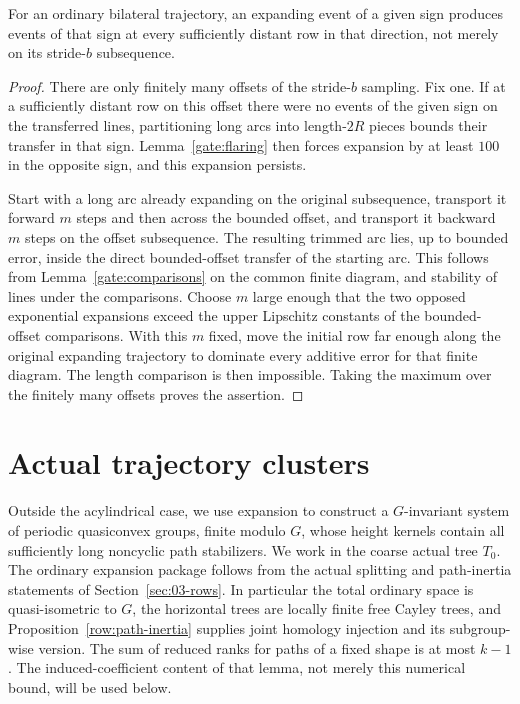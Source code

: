 \begin{lemma}\label{gate:offset}
For an ordinary bilateral trajectory, an expanding event of a given sign
produces events of that sign at every sufficiently distant row in that
direction, not merely on its stride-$b$ subsequence.
\end{lemma}
\begin{proof}
There are only finitely many offsets of the stride-$b$ sampling.  Fix one.
If at a sufficiently distant row on this offset there were no events of
the given sign on the transferred lines, partitioning long arcs into
length-$2R$ pieces bounds their transfer in that sign.  Lemma~\ref{gate:flaring}
then forces expansion by at least $100$ in the opposite sign, and this
expansion persists.

Start with a long arc already expanding on the original subsequence,
transport it forward $m$ steps and then across the bounded offset, and
transport it backward $m$ steps on the offset subsequence.  The resulting
trimmed arc lies, up to bounded error, inside the direct bounded-offset
transfer of the starting arc.  This follows from
Lemma~\ref{gate:comparisons} on the common finite diagram, and stability
of lines under the comparisons.  Choose $m$ large enough that the two
opposed exponential expansions exceed the upper Lipschitz constants of
the bounded-offset comparisons.  With this $m$ fixed, move the initial
row far enough along the original expanding trajectory to dominate every
additive error for that finite diagram.  The length comparison is then
impossible.  Taking the maximum over the finitely many offsets proves
the assertion.
\end{proof}

\section{Actual trajectory clusters}\label{gate:trajectory-clusters}

Outside the acylindrical case, we use expansion to construct a
$G$-invariant system of periodic quasiconvex groups, finite modulo $G$,
whose height kernels contain all sufficiently long noncyclic path
stabilizers.
We work in the coarse actual tree $T_0$.  The ordinary expansion
package follows from the actual splitting and path-inertia statements of
Section~\ref{sec:03-rows}.  In particular the total ordinary space is
quasi-isometric to $G$, the horizontal trees are locally finite free Cayley
trees, and Proposition~\ref{row:path-inertia} supplies joint homology injection
and its subgroup-wise version.  The sum of reduced ranks for paths of a
fixed shape is at most $k-1$.  The induced-coefficient content of that
lemma, not merely this numerical bound, will be used below.

